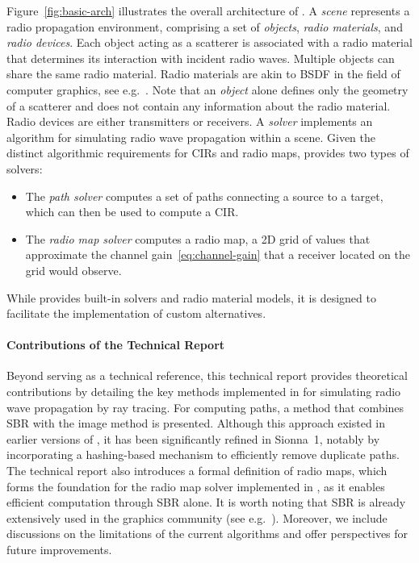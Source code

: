Figure~\ref{fig:basic-arch} illustrates the overall architecture of \SRT{}.
A \emph{scene} represents a radio propagation environment, comprising a set of \emph{objects}, \emph{radio materials}, and \emph{radio devices}.
Each object acting as a scatterer is associated with a radio material that determines its interaction with incident radio waves.
Multiple objects can share the same radio material. Radio materials are akin to \gls{BSDF} in the field of computer graphics, see e.g.~\cite[Ch.~4.3.1]{PBRT4e}.
Note that an \emph{object} alone defines only the geometry of a scatterer and does not contain any information about the radio material.
Radio devices are either transmitters or receivers.
A \emph{solver} implements an algorithm for simulating radio wave propagation within a scene.
Given the distinct algorithmic requirements for \glspl{CIR} and radio maps, \SRT{} provides two types of solvers:
\begin{itemize}
    \item The \emph{path solver} computes a set of paths connecting a source to a target, which can then be used to compute a \gls{CIR}.
    \item The \emph{radio map solver} computes a radio map, a 2D grid of values that approximate the channel gain~\eqref{eq:channel-gain} that a receiver located on the grid would observe.
\end{itemize}
While \SRT{} provides built-in solvers and radio material models, it is designed to facilitate the implementation of custom alternatives.

\paragraph{Contributions of the Technical Report}

Beyond serving as a technical reference, this technical report provides theoretical contributions by detailing the key methods implemented in \SRT{} for simulating radio wave propagation by ray tracing.
For computing paths, a method that combines \gls{SBR} with the image method is presented. Although this approach existed in earlier versions of \SRT{}, it has been significantly refined in Sionna~1, notably by incorporating a hashing-based mechanism to efficiently remove duplicate paths.
The technical report also introduces a formal definition of radio maps, which forms the foundation for the radio map solver implemented in \SRT{}, as it enables efficient computation through \gls{SBR} alone. It is worth noting that \gls{SBR} is already extensively used in the graphics community (see e.g.~\cite{PBRT4e}).
Moreover, we include discussions on the limitations of the current algorithms and offer perspectives for future improvements.

